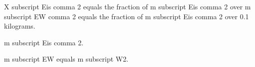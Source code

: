 X subscript Eis comma 2 equals the fraction of m subscript Eis comma 2 over m subscript EW comma 2 equals the fraction of m subscript Eis comma 2 over 0.1 kilograms.

m subscript Eis comma 2.

m subscript EW equals m subscript W2.